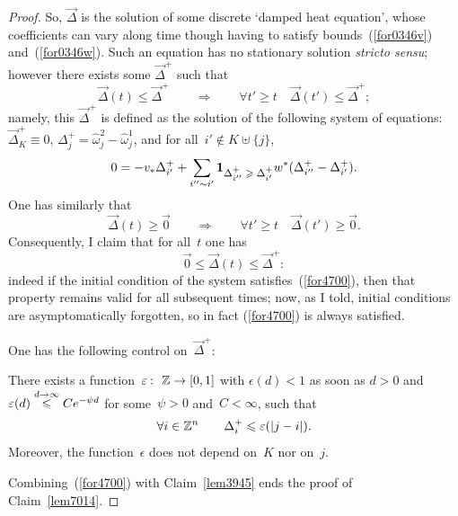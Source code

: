 \begin{proof}
So, $\vec{\Delta}$ is the solution of some discrete `damped heat equation',
whose coefficients can vary along time though having to satisfy bounds~(\ref{for0346v}) and~(\ref{for0346w}).
Such an equation has no stationary solution \emph{stricto sensu};
however there exists some $\vec\Delta^+$ such that
\[ \vec{\Delta}(t) \leq \vec\Delta^+ \qquad \Rightarrow \qquad
\forall t'\geq t \quad \vec{\Delta}(t') \leq \vec\Delta^+ ;\]
namely, this $\vec\Delta^+$ is defined as the solution
of the following system of equations:
$\vec\Delta^+_K \equiv 0$, $\Delta^+_j = \hat\omega_j^2 - \hat\omega_j^1$,
and for all~$i'\notin K\uplus\{j\}$,
\[\label{for7756a} 0 = - v_* \Delta^+_{i'} + \sum_{i''\sim i'}
\1{\Delta^+_{i''}\geq\Delta^+_{i'}}w^* (\Delta^+_{i''} - \Delta^+_{i'}) .\]
%
One has similarly that
\[ \vec{\Delta}(t) \geq \vec0 \qquad \Rightarrow \qquad
\forall t'\geq t \quad \vec{\Delta}(t') \geq \vec0 .\]
%
Consequently, I claim that for all~$t$ one has
\[\label{for4700} \vec0 \leq \vec\Delta(t) \leq \vec\Delta^+ :\]
indeed if the initial condition of the system satisfies~(\ref{for4700}),
then that property remains valid for all subsequent times;
now, as I told, initial conditions are asymptomatically forgotten,
so in fact (\ref{for4700}) is always satisfied.

One has the following control on~$\vec\Delta^+$:
\begin{Clm}\label{lem3945}
There exists a function~$\epsilon \colon \ZZ \to [0,1]$ with
$\epsilon(d) < 1$ as soon as $d > 0$ and $\varepsilon(d) \stackrel{d\to\infty}{\leqslant} Ce^{-\psi d}$
for some~$\psi > 0$ and~$C < \infty$, such that
\[ \forall i \in \mathbb{Z}^n \qquad \Delta^+_i \leqslant \varepsilon(|j-i|) .\]
Moreover, the function~$\epsilon$ does not depend on~$K$ nor on~$j$.
\end{Clm}
%
Combining~(\ref{for4700}) with Claim~\ref{lem3945} ends the proof of Claim~\ref{lem7014}.
\end{proof}

